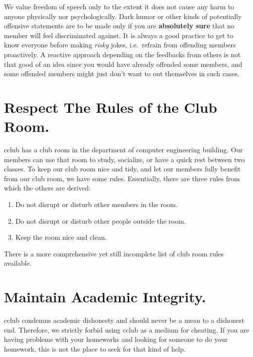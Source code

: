 \documentclass{article}
\begin{document}
We value freedom of speech only to the extent it does not cause any harm to
anyone physically nor psychologically. Dark humor or other kinds of potentially
offensive statements are to be made only if you are \textbf{absolutely sure}
that no member will feel discriminated against. It is always a good practice to
get to know everyone before making \textit{risky} jokes, i.e.\ refrain from
offending members proactively.  A reactive approach depending on the feedbacks
from others is not that good of an idea since you would have already offended
some members, and some offended members might just don't want to out themselves
in such cases.

\section*{Respect The Rules of the Club Room.}
cclub has a club room in the department of computer engineering building. Our
members can use that room to study, socialize, or have a quick rest between two
classes. To keep our club room nice and tidy, and let our members fully benefit
from our club room, we have some rules. Essentially, there are three rules from
which the others are derived:
\begin{enumerate}
		\item Do not disrupt or disturb other members in the room.
		\item Do not disrupt or disturb other people outside the room.
		\item Keep the room nice and clean.
\end{enumerate}

There is a more comprehensive yet still incomplete list of club room rules available.

\section*{Maintain Academic Integrity.}
cclub condemns academic dishonesty and should never be a mean to a dishonest
end. Therefore, we strictly forbid using cclub as a medium for cheating. If you
are having problems with your homeworks and looking for someone to do your
homework, this is not the place to seek for that kind of help.
\end{document}
